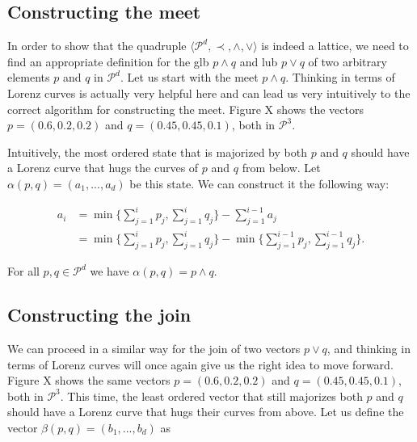 \subsection{Constructing the meet} \label{sec:meet}

In order to show that the quadruple $\langle \mathcal{P}^d, \prec, \wedge, \vee \rangle$ is indeed a lattice, we need to find an appropriate definition for the glb $p \wedge q$ and lub $p \vee q$ of two arbitrary elements $p$ and $q$ in $\mathcal{P}^d$. Let us start with the meet $p \wedge q$. Thinking in terms of Lorenz curves is actually very helpful here and can lead us very intuitively to the correct algorithm for constructing the meet. Figure X shows the vectors $p = (0.6, 0.2, 0.2)$ and $q = (0.45, 0.45, 0.1)$, both in $\mathcal{P}^3$.

Intuitively, the most ordered state that is majorized by both $p$ and $q$ should have a Lorenz curve that hugs the curves of $p$ and $q$ from below. Let $\alpha(p, q) = (a_1, ..., a_d)$ be this state. We can construct it the following way:

\begin{align}
    a_i &= \min \Big\{ \sum_{j=1}^{i} p_j , \sum_{j=1}^{i} q_j \Big\} - \sum_{j=1}^{i-1} a_j \\
    &= \min \Big\{ \sum_{j=1}^{i} p_j , \sum_{j=1}^{i} q_j \Big\} - \min \Big\{ \sum_{j=1}^{i-1} p_j , \sum_{j=1}^{i-1} q_j \Big\}.
\end{align}

\begin{lemma} \label{lem:meet}
    For all $p, q \in \mathcal{P}^d$ we have $\alpha(p, q) = p \wedge q$.
\end{lemma}



\subsection{Constructing the join} \label{sec:join}

We can proceed in a similar way for the join of two vectors $p \vee q$, and thinking in terms of Lorenz curves will once again give us the right idea to move forward. Figure X shows the same vectors $p = (0.6, 0.2, 0.2)$ and $q = (0.45, 0.45, 0.1)$, both in $\mathcal{P}^3$. This time, the least ordered vector that still majorizes both $p$ and $q$ should have a Lorenz curve that hugs their curves from above. Let us define the vector $\beta(p, q) = (b_1, ..., b_d)$ as 

